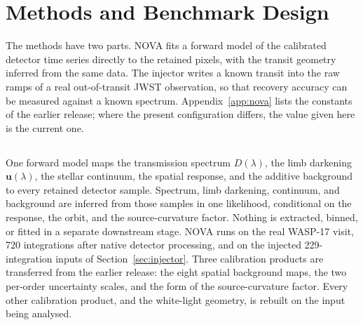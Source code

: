 \section{Methods and Benchmark Design}
\label{sec:methods}


The methods have two parts. NOVA fits a forward model of the calibrated
detector time series directly to the retained pixels, with the transit
geometry inferred from the same data. The injector writes a known
transit into the raw ramps of a real out-of-transit JWST observation, so
that recovery accuracy can be measured against a known spectrum.
Appendix~\ref{app:nova} lists the constants of the
earlier release; where the present configuration differs, the value
given here is the current one.

\subsection{\nova{}}


One forward model maps the transmission spectrum $D(\lambda)$, the limb
darkening $\bm{u}(\lambda)$, the stellar continuum, the spatial
response, and the additive background to every retained detector
sample. Spectrum, limb darkening, continuum, and background are inferred
from those samples in one likelihood, conditional on the response, the
orbit, and the source-curvature factor. Nothing is extracted, binned, or
fitted in a separate downstream stage. NOVA runs on the real WASP-17 visit, 720 integrations after native detector
processing, and on the injected 229-integration inputs of
Section~\ref{sec:injector}. Three calibration products are transferred
from the earlier release: the eight spatial background maps, the two
per-order uncertainty scales, and the form of the source-curvature
factor. Every other calibration product, and the white-light geometry,
is rebuilt on the input being analysed.


